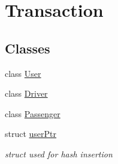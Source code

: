 \hypertarget{group___user}{}\section{Transaction}
\label{group___user}
\subsection*{Classes}
\begin{DoxyCompactItemize}
\item 
class \hyperlink{class_user}{User}
\item 
class \hyperlink{class_driver}{Driver}
\item 
class \hyperlink{class_passenger}{Passenger}
\item 
struct \hyperlink{structuser_ptr}{user\+Ptr}
\begin{DoxyCompactList}\small\item\em struct used for hash insertion \end{DoxyCompactList}\end{DoxyCompactItemize}
